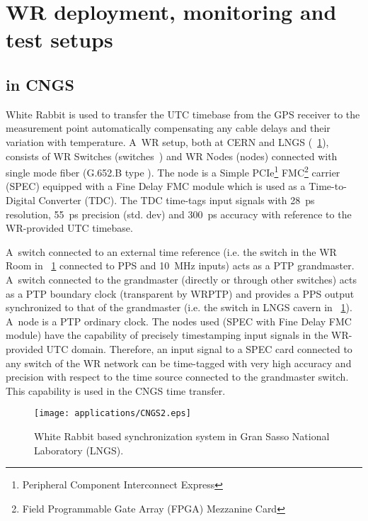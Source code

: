 \section{WR deployment, monitoring and test setups}
\label{sec:deplAndMeas}
\subsection{ in CNGS} 

White Rabbit is used to transfer the UTC timebase from the GPS receiver to the 
measurement point automatically compensating any cable delays and their variation with temperature. 
A~WR setup, both at CERN and LNGS (\figurename~\ref{fig:wrLNGStiming}), consists of WR Switches 
(switches~\cite{biblio:WRswitch}) 
and WR Nodes (nodes) connected with single mode fiber (G.652.B type \cite{biblio:Draka}). %
The node is a Simple PCIe\footnote{Peripheral Component Interconnect Express} 
FMC\footnote{Field Programmable Gate Array (FPGA) Mezzanine Card} carrier (SPEC) \cite{biblio:spec}
equipped with a Fine Delay FMC module \cite{biblio:fineDelay} which is used as 
a Time-to-Digital Converter (TDC). The TDC time-tags input signals with 28~ps 
resolution, 55~ps precision (std. dev) and 300~ps accuracy \cite{biblio:fineDelay}
with reference to the WR-provided UTC timebase.

A~switch connected to an external time reference (i.e. the switch in the WR Room in 
\figurename~\ref{fig:wrLNGStiming} connected to PPS and 10~MHz inputs) acts as a 
PTP grandmaster. A~switch connected to the grandmaster (directly or through other switches) 
acts as a PTP boundary clock (transparent  by WRPTP)
and provides a PPS output synchronized to that of the grandmaster (i.e. the switch in LNGS cavern in 
\figurename~\ref{fig:wrLNGStiming}). 
A~node is a PTP ordinary clock. The nodes used (SPEC with Fine Delay FMC module) 
have the capability of precisely timestamping input signals in the WR-provided UTC domain. 
Therefore, an input signal to a SPEC card connected to any switch of the WR network can be 
time-tagged with very high accuracy and precision with respect to the 
time source connected to the grandmaster switch. This capability is used in the CNGS time transfer.

\begin{figure}[!t]
\centering
\texttt{[image: applications/CNGS2.eps]}
\caption{White Rabbit based synchronization system in Gran Sasso National Laboratory (LNGS).}
\label{fig:wrLNGStiming}
\end{figure}


